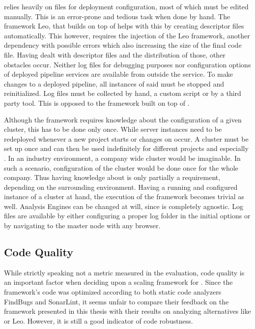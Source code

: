\uimaas{} relies heavily on \xml{} files for deployment configuration, most of which must be edited manually. This is an error-prone and tedious task when done by hand. The framework Leo, that builds on top of \uimaas{} helps with this by creating \xml{} descriptor files automatically. This however, requires the injection of the Leo framework, another dependency with possible errors which also increasing the size of the final code file. Having dealt with \xml{} descriptor files and the distribution of those, other obstacles occur. Neither log files for debugging purposes nor configuration options of deployed pipeline services are available from outside the service. To make changes to a deployed pipeline, all instances of said \anen{} must be stopped and reinitialized. Log files must be collected by hand, a custom script or by a third party tool. This is opposed to the framework built on top of \spark{}.

Although the framework requires knowledge about the configuration of a given \spark{} cluster, this has to be done only once. While \uimaas{} server instances need to be redeployed whenever a new project starts or changes on \anens{} occur. A \spark{} cluster must be set up once and can then be used indefinitely for different projects and especially \anens{}. In an industry environment, a company wide \spark{} cluster would be imaginable. In such a scenario, configuration of the \spark{} cluster would be done once for the whole company. Thus having knowledge about \spark{} is only partially a requirement, depending on the surrounding environment. Having a running and configured instance of a \spark{} cluster at hand, the execution of the framework becomes trivial as well. Analysis Engines can be changed at will, since \spark{} is completely \uima{} agnostic. Log files are available by either configuring a proper log folder in the initial \spark{} options or by navigating to the \spark{} master node with any browser.
\subsection{Code Quality}
While strictly speaking not a metric measured in the evaluation, code quality is an important factor when deciding upon a scaling framework for \uima{}. Since the framework's code was optimized according to both static code analyzers FindBugs and SonarLint, it seems unfair to compare their feedback on the framework presented in this thesis with their results on analyzing alternatives like \uimaas{} or Leo. However, it is still a good indicator of code robustness.


